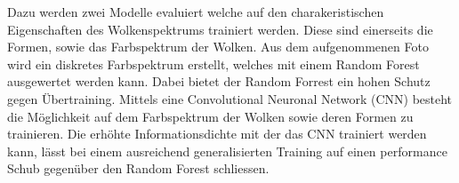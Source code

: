Dazu werden zwei Modelle evaluiert welche auf den charakeristischen
Eigenschaften des Wolkenspektrums trainiert werden. 
Diese sind einerseits die Formen, sowie das Farbspektrum der Wolken.
Aus dem aufgenommenen Foto wird ein diskretes Farbspektrum erstellt, welches 
mit einem Random Forest ausgewertet werden kann.
Dabei bietet der Random Forrest ein hohen Schutz gegen Übertraining.
Mittels eine Convolutional Neuronal Network (CNN) besteht die Möglichkeit auf
dem Farbspektrum der Wolken sowie deren Formen zu trainieren. 
Die erhöhte Informationsdichte mit der das CNN trainiert werden kann, 
lässt bei einem ausreichend generalisierten Training auf einen performance 
Schub gegenüber den Random Forest schliessen.


